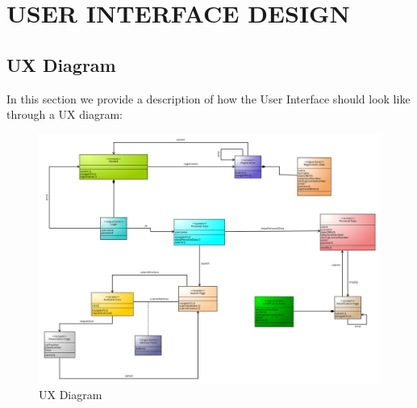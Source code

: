 \section{USER INTERFACE DESIGN}
\subsection{UX Diagram}
In this section we provide a description of how the User Interface should look like through a UX diagram:
\begin{figure}[H]	
	\centering
	\includegraphics[width=\textwidth]{img/UX_design_document}
	\caption{UX Diagram}
\end{figure}
